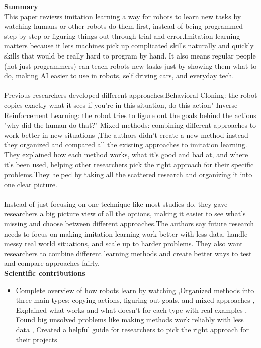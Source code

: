 \documentclass[report.tex]{subfiles}
\begin{document}
\noindent\textbf{Summary} \\
This paper reviews imitation learning  a way for robots to learn new tasks by watching humans or other robots do them first, instead of being programmed step by step or figuring things out through trial and error.Imitation learning matters because it lets machines pick up complicated skills naturally and quickly   skills that would be really hard to program by hand. It also means regular people (not just programmers) can teach robots new tasks just by showing them what to do, making AI easier to use in robots, self driving cars, and everyday tech.\\
\\
Previous researchers developed different approaches:Behavioral Cloning: the robot copies exactly what it sees  if you're in this situation, do this action" Inverse Reinforcement Learning: the robot tries to figure out the goals behind the actions   "why did the human do that?" Mixed methods: combining different approaches to work better in new situations ,The authors didn't create a new method   instead they organized and compared all the existing approaches to imitation learning. They explained how each method works, what it's good and bad at, and where it's been used, helping other researchers pick the right approach for their specific problems.They helped by taking all the scattered research and organizing it into one clear picture.\\\\ Instead of just focusing on one technique like most studies do, they gave researchers a big picture view of all the options, making it easier to see what's missing and choose between different approaches.The authors say future research needs to focus on making imitation learning work better with less data, handle messy real world situations, and scale up to harder problems. They also want researchers to combine different learning methods and create better ways to test and compare approaches fairly.\\


\noindent\textbf{Scientific contributions} 
\begin{itemize}
        \item  Complete overview of how robots learn by watching ,Organized methods into three main types: copying actions, figuring out goals, and mixed approaches , Explained what works and what doesn't for each type with real examples , Found big unsolved problems like making methods work reliably with less data , Created a helpful guide for researchers to pick the right approach for their projects
        
\end{itemize}
\end{document}
